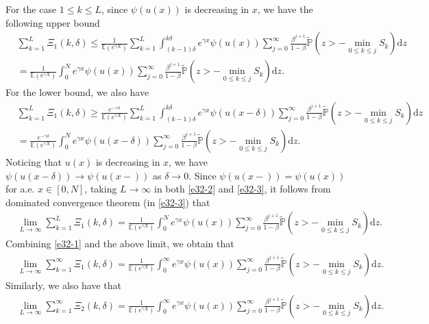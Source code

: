 \documentclass[11pt]{article}
\numberwithin{equation}{section}
\begin{document}
For the case $1\leq k\leq L$,  since $\psi(u(x))$ is decreasing in $x$, we have the following upper bound
\begin{align}\label{e32-2}
	& \sum_{k=1}^L \Xi_1(k, \delta)\leq \frac{1}{\mathbb{E}(e^{\gamma X})} \sum_{k=1}^L  \int_{(k-1)\delta}^{k\delta} e^{\gamma x}\psi(u(x))  \sum_{j=0}^\infty \frac{\beta^{j+1}}{1-\beta} \widetilde{\mathbb{P}}\left(z>-\min_{0\leq k\leq j} S_k \right)\mathrm{d} z \nonumber\\
	& =\frac{1}{\mathbb{E}(e^{\gamma X})} \int_0^N e^{\gamma x}\psi(u(x))  \sum_{j=0}^\infty \frac{\beta^{j+1}}{1-\beta} \widetilde{\mathbb{P}}\left(z> -\min_{0\leq k\leq j} S_k \right)\mathrm{d} z. 
\end{align}
For the lower bound, we also have 
\begin{align}\label{e32-3}
	& \sum_{k=1}^L  \Xi_1(k, \delta) \geq\frac{e^{-\gamma\delta}}{\mathbb{E}(e^{\gamma X})} \sum_{k=1}^L   \int_{(k-1)\delta}^{k\delta}e^{\gamma x}\psi(u(x-\delta)) \sum_{j=0}^\infty \frac{\beta^{j+1}}{1-\beta} \widetilde{\mathbb{P}}\left(z> -\min_{0\leq k\leq j} S_k \right)\mathrm{d} z\nonumber\\
	& =  \frac{e^{-\gamma \delta}}{\mathbb{E}(e^{\gamma X})} \int_0^N e^{\gamma x}\psi(u(x-\delta)) \sum_{j=0}^\infty \frac{\beta^{j+1}}{1-\beta} \widetilde{\mathbb{P}}\left(z> -\min_{0\leq k\leq j} S_k \right)\mathrm{d} z.
\end{align}
Noticing that $u(x)$ is decreasing in $x$, we have $\psi(u(x-\delta))\to \psi(u(x-))$ as $\delta\to 0$. Since $\psi(u(x-))=\psi(u(x))$ for a.e. $x\in [0,N]$, 
taking $L\to\infty $ in both \eqref{e32-2} and \eqref{e32-3}, it follows from dominated convergence theorem (in \eqref{e32-3}) that 
\begin{align}
	& \lim_{L\to\infty}  \sum_{k=1}^L  \Xi_1(k, \delta)  = \frac{1}{\mathbb{E}(e^{\gamma X})} \int_0^N e^{\gamma x}\psi(u(x))  \sum_{j=0}^\infty \frac{\beta^{j+1}}{1-\beta} \widetilde{\mathbb{P}}\left(z> -\min_{0\leq k\leq j} S_k \right)\mathrm{d} z. 
\end{align}
Combining \eqref{e32-1} and the above limit, we obtain that 
\begin{align}\label{e32-4}
	& \lim_{L\to\infty}\sum_{k=1}^\infty \Xi_1(k, \delta) =\frac{1}{\mathbb{E}(e^{\gamma X})} \int_0^\infty e^{\gamma x}\psi(u(x))  \sum_{j=0}^\infty \frac{\beta^{j+1}}{1-\beta} \widetilde{\mathbb{P}}\left(z> -\min_{0\leq k\leq j} S_k \right)\mathrm{d} z. 
\end{align}
Similarly, we also have that 
\begin{align}\label{e32-5}
	& \lim_{L\to\infty} \sum_{k=1}^\infty \Xi_2(k, \delta)=\frac{1}{\mathbb{E}(e^{\gamma X})} \int_0^\infty e^{\gamma x}\psi(u(x))  \sum_{j=0}^\infty \frac{\beta^{j+1}}{1-\beta} \widetilde{\mathbb{P}}\left(z> -\min_{0\leq k\leq j} S_k \right)\mathrm{d} z. 
\end{align}
\end{document}
